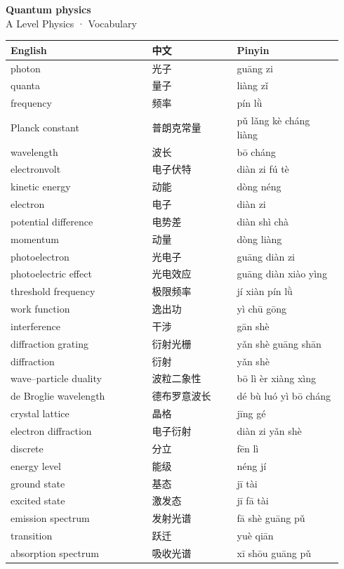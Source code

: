 \documentclass[11pt]{article}
\begin{document}
\begin{center}
  {\LARGE\bfseries Quantum physics}\\[0.35em]
  {\large A Level Physics · Vocabulary}
\end{center}
\vspace{0.6em}

\begin{longtable}{@{}p{0.40\linewidth}p{0.24\linewidth}p{0.30\linewidth}@{}}
\toprule
\textbf{English} & \textbf{中文} & \textbf{Pinyin} \\
\midrule
\endhead
\bottomrule
\endlastfoot
photon & 光子 & guāng zi \\
quanta & 量子 & liàng zǐ \\
frequency & 频率 & pín lǜ \\
Planck constant & 普朗克常量 & pǔ lǎng kè cháng liàng \\
wavelength & 波长 & bō cháng \\
electronvolt & 电子伏特 & diàn zi fú tè \\
kinetic energy & 动能 & dòng néng \\
electron & 电子 & diàn zi \\
potential difference & 电势差 & diàn shì chà \\
momentum & 动量 & dòng liàng \\
photoelectron & 光电子 & guāng diàn zi \\
photoelectric effect & 光电效应 & guāng diàn xiào yìng \\
threshold frequency & 极限频率 & jí xiàn pín lǜ \\
work function & 逸出功 & yì chū gōng \\
interference & 干涉 & gān shè \\
diffraction grating & 衍射光栅 & yǎn shè guāng shān \\
diffraction & 衍射 & yǎn shè \\
wave–particle duality & 波粒二象性 & bō lì èr xiàng xìng \\
de Broglie wavelength & 德布罗意波长 & dé bù luó yì bō cháng \\
crystal lattice & 晶格 & jīng gé \\
electron diffraction & 电子衍射 & diàn zi yǎn shè \\
discrete & 分立 & fēn lì \\
energy level & 能级 & néng jí \\
ground state & 基态 & jī tài \\
excited state & 激发态 & jī fā tài \\
emission spectrum & 发射光谱 & fā shè guāng pǔ \\
transition & 跃迁 & yuè qiān \\
absorption spectrum & 吸收光谱 & xī shōu guāng pǔ \\
\end{longtable}
\end{document}
